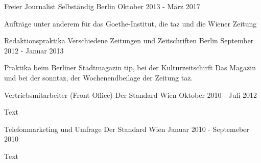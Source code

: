 \begin{cventries}
  \cventry
    {Freier Journalist} %
    {Selbständig} %
    {Berlin} %
    {Oktober 2013 - März 2017} %
    {
      \begin{cvitems} %
        \item {Aufträge unter anderem für das Goethe-Institut, die taz und die Wiener Zeitung}
       \end{cvitems}
    }

 \cventry
    {Redaktionspraktika} %
    {Verschiedene Zeitungen und Zeitschriften} %
    {Berlin} %
    {September 2012 - Januar 2013} %
    { 
      \begin{cvitems} %
        \item {Praktika beim Berliner Stadtmagazin tip, bei der Kulturzeitschirft Das Magazin und bei der sonntaz, der Wochenendbeilage der Zeitung taz.}
      \end{cvitems}
    }

  \cventry
    {Vertriebsmitarbeiter (Front Office)} %
    {Der Standard} %
    {Wien} %
    {Oktober 2010 - Juli 2012} %
    {
      \begin{cvitems} %
        \item {Text}
      \end{cvitems}
    }

\cventry
{Telefonmarketing und Umfrage} %
{Der Standard} %
{Wien} %
{Januar 2010 - Septemeber 2010} %
{
  \begin{cvitems} %
    \item {Text}
  \end{cvitems}
}

\end{cventries}
